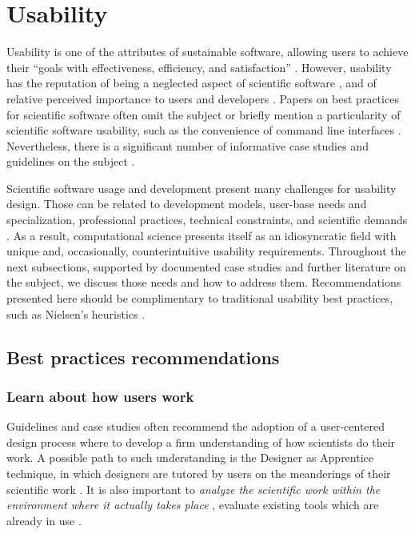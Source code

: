 \section{Usability}
\label{sec:usability}

Usability is one of the attributes of sustainable software, allowing users to achieve their “goals with effectiveness, efficiency, and satisfaction” \cite[p.3]{Venters_WSSSPE}. However, usability has the reputation of being a neglected aspect of scientific software \cite{Ahmed:2014}, and of relative perceived importance to users and developers \cite{Nguyen-Hoan:2010, Hucka:2016}. Papers on best practices for scientific software often omit the subject \cite{Stodden_WSSSPE, Wilson:2016} or briefly mention a particularity of scientific software usability, such as the convenience of command line interfaces \cite{bestprSC}. Nevertheless, there is a significant number of informative case studies and guidelines on the subject \cite{MacLeod:1992, Springmeyer:1993, Pancake:1996, Javahery:2004, Schraefel:2004,Letondal:2004, Talbott:2005, Macaulay:2009, DeRoure:2009, Keefe:2010, DeMatos:2013, Ahmed:2014, Beg:2016}.

Scientific software usage and development present many challenges for usability design. Those can be related to development models, user-base needs and specialization, professional practices, technical constraints, and scientific demands \cite{Queiroz:2016}. As a result, computational science presents itself as an idiosyncratic field with unique and, occasionally, counterintuitive usability requirements. Throughout the next subsections, supported by documented case studies and further literature on the subject, we discuss those needs and how to address them. Recommendations presented here should be complimentary to traditional usability best practices, such as Nielsen's heuristics \cite{Nielsen:1994}.

\subsection{Best practices recommendations}

\subsubsection{Learn about how users work}

Guidelines and case studies often recommend the adoption of a user-centered design process where to develop a firm understanding of how scientists do their work.  A possible path to such understanding is the Designer as Apprentice technique, in which designers are tutored by users on the meanderings of their scientific work \cite{Springmeyer:1993}.  It is also important to \emph{analyze the scientific work within the environment where it actually takes place} \cite{Pancake:1996}, evaluate existing tools which are already in use \cite{Javahery:2004}.  

